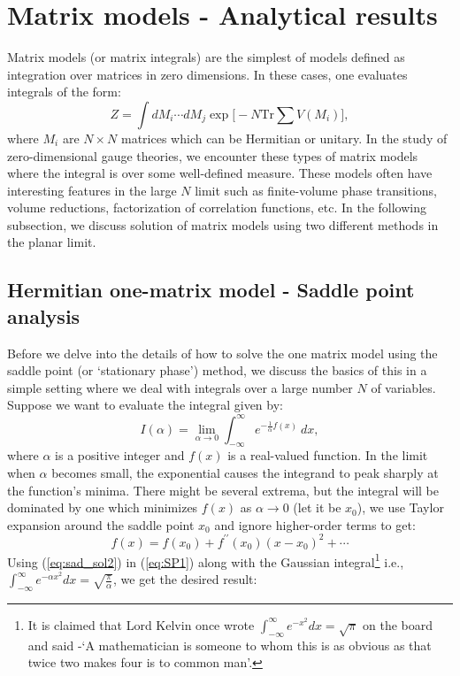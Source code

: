 \documentclass[letter,11pt]{article}
\begin{document}
\section{\label{sec:MMAres}Matrix models - Analytical results} 
Matrix models (or matrix integrals) are the simplest of models 
defined as integration over matrices in zero dimensions. 
In these cases, one evaluates integrals of the form:
\begin{equation}
Z = \int dM_{i} \cdots dM_{j} \exp\Bigg[-N \mathrm{Tr} \sum V(M_{i})\Bigg] ,
\end{equation}
where $M_{i}$ are $N \times N$ matrices which can be Hermitian or unitary.  
In the study of zero-dimensional gauge theories, we encounter these types of matrix models where the integral is over some well-defined measure. 
These models often have interesting features in the large $N$ limit such as finite-volume phase transitions, 
volume reductions, factorization of correlation functions, etc. In the following subsection, we discuss solution of 
matrix models using two different methods in the planar limit. 

\subsection{Hermitian one-matrix model - Saddle point analysis}
Before we delve into the details of how to solve the one matrix model using the saddle point (or `stationary phase') method, we discuss the basics of this in a simple setting where we deal with integrals over a large number $N$ of variables. Suppose we want to evaluate the integral given by:
\begin{equation}
\label{eq:SP1} 
I(\alpha) = \lim_{\alpha \to 0} \int_{-\infty}^{\infty} e^{-\frac{1}{\alpha}f(x)} ~dx, 
\end{equation}
where $\alpha$ is a positive integer and $f(x)$ is a real-valued function. In the limit when $\alpha$ becomes small, the exponential causes the integrand to peak sharply at the function's minima. There might be several extrema, but the integral will be dominated by one which minimizes $f(x)$ as $\alpha \to 0$ (let it be $x_{0}$), 
we use Taylor expansion around the saddle point $x_{0}$ and ignore higher-order terms to get:
\begin{equation}
	\label{eq:sad_sol2}
	f(x) = f(x_{0}) + f^{\prime\prime}(x_{0}) (x-x_0)^{2} + \cdots 
\end{equation}
Using (\ref{eq:sad_sol2}) in (\ref{eq:SP1}) along with the Gaussian integral\footnote{It is claimed that Lord Kelvin once wrote $\int_{-\infty}^{\infty}e^{-x^2} dx = \sqrt{\pi}$ on the board and said -`A mathematician is someone to whom this is as obvious as that 
twice two makes four is to common man'.} 
i.e., $\int_{-\infty}^{\infty} e^{-\alpha x^2} dx = \sqrt{\frac{\pi}{\alpha}}$, we get the desired result:
\end{document}
